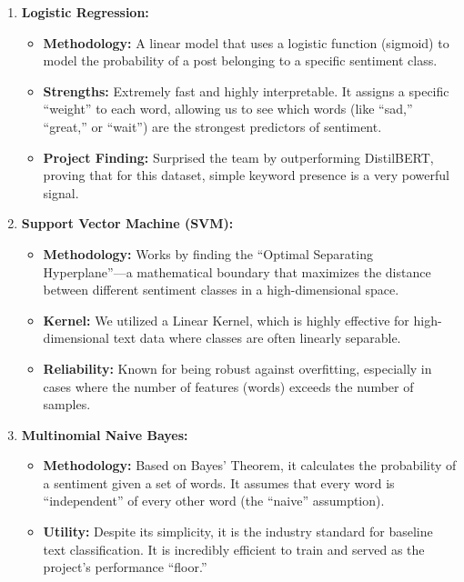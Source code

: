 \documentclass[
]{article}
\providecommand{\tightlist}{%
  \setlength{\itemsep}{0pt}\setlength{\parskip}{0pt}}
\begin{document}
\begin{enumerate}
\def\labelenumi{\arabic{enumi}.}
\setcounter{enumi}{4}
\tightlist
\item
  \textbf{Logistic Regression:}

  \begin{itemize}
  \tightlist
  \item
    \textbf{Methodology:} A linear model that uses a logistic function
    (sigmoid) to model the probability of a post belonging to a specific
    sentiment class.
  \item
    \textbf{Strengths:} Extremely fast and highly interpretable. It
    assigns a specific ``weight'' to each word, allowing us to see which
    words (like ``sad,'' ``great,'' or ``wait'') are the strongest
    predictors of sentiment.
  \item
    \textbf{Project Finding:} Surprised the team by outperforming
    DistilBERT, proving that for this dataset, simple keyword presence
    is a very powerful signal.
  \end{itemize}
\item
  \textbf{Support Vector Machine (SVM):}

  \begin{itemize}
  \tightlist
  \item
    \textbf{Methodology:} Works by finding the ``Optimal Separating
    Hyperplane''---a mathematical boundary that maximizes the distance
    between different sentiment classes in a high-dimensional space.
  \item
    \textbf{Kernel:} We utilized a Linear Kernel, which is highly
    effective for high-dimensional text data where classes are often
    linearly separable.
  \item
    \textbf{Reliability:} Known for being robust against overfitting,
    especially in cases where the number of features (words) exceeds the
    number of samples.
  \end{itemize}
\item
  \textbf{Multinomial Naive Bayes:}

  \begin{itemize}
  \tightlist
  \item
    \textbf{Methodology:} Based on Bayes' Theorem, it calculates the
    probability of a sentiment given a set of words. It assumes that
    every word is ``independent'' of every other word (the ``naive''
    assumption).
  \item
    \textbf{Utility:} Despite its simplicity, it is the industry
    standard for baseline text classification. It is incredibly
    efficient to train and served as the project's performance
    ``floor.''
  \end{itemize}
\end{enumerate}
\end{document}

